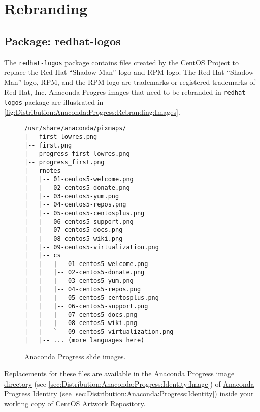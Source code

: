 
\section{Rebranding}

\subsection{Package: redhat-logos} 

The \texttt{redhat-logos} package contains files created by the CentOS
Project to replace the Red Hat ``Shadow Man'' logo and  RPM logo.  The
Red Hat ``Shadow Man'' logo, RPM, and the RPM logo are trademarks or
registered trademarks of Red Hat, Inc. Anaconda Progres images that
need to be rebranded in \texttt{redhat-logos} package are illustrated
in \autoref{fig:Distribution:Anaconda:Progress:Rebranding:Images}.

\begin{figure}[!hbp]
\hrulefill
\begin{verbatim}
/usr/share/anaconda/pixmaps/
|-- first-lowres.png
|-- first.png
|-- progress_first-lowres.png
|-- progress_first.png
|-- rnotes
|   |-- 01-centos5-welcome.png
|   |-- 02-centos5-donate.png
|   |-- 03-centos5-yum.png
|   |-- 04-centos5-repos.png
|   |-- 05-centos5-centosplus.png
|   |-- 06-centos5-support.png
|   |-- 07-centos5-docs.png
|   |-- 08-centos5-wiki.png
|   |-- 09-centos5-virtualization.png
|   |-- cs
|   |   |-- 01-centos5-welcome.png
|   |   |-- 02-centos5-donate.png
|   |   |-- 03-centos5-yum.png
|   |   |-- 04-centos5-repos.png
|   |   |-- 05-centos5-centosplus.png
|   |   |-- 06-centos5-support.png
|   |   |-- 07-centos5-docs.png
|   |   |-- 08-centos5-wiki.png
|   |   `-- 09-centos5-virtualization.png
|   |-- ... (more languages here)
\end{verbatim}
\hrulefill
\caption{Anaconda Progress slide images.%
   \label{fig:Distribution:Anaconda:Progress:Rebranding:Images}}
\end{figure}

Replacements for these files are available in the
\hyperlink{sec:Distribution:Anaconda:Progress:Identity:Image}{Anaconda
Progress image directory} (see
\autoref{sec:Distribution:Anaconda:Progress:Identity:Image}) of
\hyperlink{sec:Distribution:Anaconda:Progress:Identity}{Anaconda
Progress Identity} (see
\autoref{sec:Distribution:Anaconda:Progress:Identity}) inside your
working copy of CentOS Artwork Repository.

